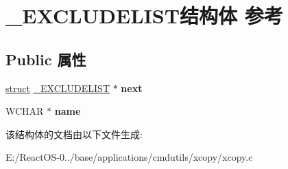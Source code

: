 \hypertarget{struct___e_x_c_l_u_d_e_l_i_s_t}{}\section{\+\_\+\+E\+X\+C\+L\+U\+D\+E\+L\+I\+S\+T结构体 参考}
\label{struct___e_x_c_l_u_d_e_l_i_s_t}
\subsection*{Public 属性}
\begin{DoxyCompactItemize}
\item 
\mbox{\label{struct___e_x_c_l_u_d_e_l_i_s_t_a05930cffc62db867c8ea078bfb491564}} 
\hyperlink{interfacestruct}{struct} \hyperlink{struct___e_x_c_l_u_d_e_l_i_s_t}{\+\_\+\+E\+X\+C\+L\+U\+D\+E\+L\+I\+ST} $\ast$ {\bfseries next}
\item 
\mbox{\label{struct___e_x_c_l_u_d_e_l_i_s_t_a5e4170db435449a654caf04fe81ac2ae}} 
W\+C\+H\+AR $\ast$ {\bfseries name}
\end{DoxyCompactItemize}


该结构体的文档由以下文件生成\+:\begin{DoxyCompactItemize}
\item 
E\+:/\+React\+O\+S-\/0../base/applications/cmdutils/xcopy/xcopy.\+c\end{DoxyCompactItemize}
